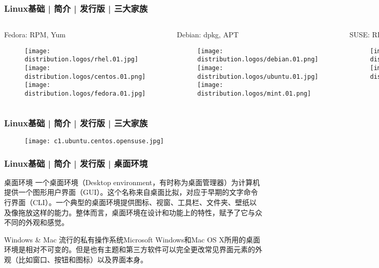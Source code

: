 \begin{frame}
  \frametitle{Linux基础 | 简介 | 发行版 | \alert{三大家族}}
  \begin{columns}
    \begin{block}{Fedora: RPM, Yum}
      \begin{figure}
        \centering
        \texttt{[image: distribution.logos/rhel.01.jpg]}\\
        \texttt{[image: distribution.logos/centos.01.png]}\\
        \texttt{[image: distribution.logos/fedora.01.jpg]}
      \end{figure}
    \end{block}
    \begin{block}{Debian: dpkg, APT}
      \begin{figure}
        \centering
        \texttt{[image: distribution.logos/debian.01.png]}\\
        \texttt{[image: distribution.logos/ubuntu.01.jpg]}\\
        \texttt{[image: distribution.logos/mint.01.png]}
      \end{figure}
    \end{block}
    \begin{block}{SUSE: RPM, Zypper}
      \begin{figure}
        \centering
        \texttt{[image: distribution.logos/suse.01.jpg]}\\
	\vspace{0.5cm}
        \texttt{[image: distribution.logos/opensuse.01.jpg]}
      \end{figure}
    \end{block}
  \end{columns}
\end{frame}

\begin{frame}
  \frametitle{Linux基础 | 简介 | 发行版 | \alert{三大家族}}
  \begin{figure}
    \centering
    \texttt{[image: c1.ubuntu.centos.opensuse.jpg]}
  \end{figure}
\end{frame}

\begin{frame}
  \frametitle{Linux基础 | 简介 | 发行版 | 桌面环境}
  \begin{block}{桌面环境}
    一个桌面环境（Desktop environment，有时称为桌面管理器）为计算机提供一个图形用户界面（GUI）。这个名称来自桌面比拟，对应于早期的文字命令行界面（CLI）。一个典型的桌面环境提供图标、视窗、工具栏、文件夹、壁纸以及像拖放这样的能力。整体而言，桌面环境在设计和功能上的特性，赋予了它与众不同的外观和感觉。
  \end{block}
  \pause
  \begin{block}{Windows \& Mac}
    流行的私有操作系统Microsoft Windows和Mac OS X所用的桌面环境是相对不可变的。但是也有主题和第三方软件可以完全更改常见界面元素的外观（比如窗口、按钮和图标）以及界面本身。
  \end{block}
\end{frame}

